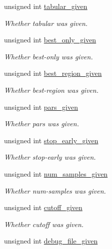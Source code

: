 \begin{DoxyCompactItemize}
unsigned int \hyperlink{structgengetopt__args__info_a3b5a200c98e9f33b1dfa0adf5fbaf69d}{tabular\+\_\+given}
\begin{DoxyCompactList}\small\item\em Whether tabular was given. \end{DoxyCompactList}\item 
unsigned int \hyperlink{structgengetopt__args__info_a6c48b4d066a85f4a580a6a64dbdb176e}{best\+\_\+only\+\_\+given}
\begin{DoxyCompactList}\small\item\em Whether best-\/only was given. \end{DoxyCompactList}\item 
unsigned int \hyperlink{structgengetopt__args__info_afd4b6f3efee5f421948359ec5eea335c}{best\+\_\+region\+\_\+given}
\begin{DoxyCompactList}\small\item\em Whether best-\/region was given. \end{DoxyCompactList}\item 
unsigned int \hyperlink{structgengetopt__args__info_abaf16e517f88e5ad41e06e0584045074}{pars\+\_\+given}
\begin{DoxyCompactList}\small\item\em Whether pars was given. \end{DoxyCompactList}\item 
unsigned int \hyperlink{structgengetopt__args__info_a69729e2dba0de954d98a56a1b3d8d1c1}{stop\+\_\+early\+\_\+given}
\begin{DoxyCompactList}\small\item\em Whether stop-\/early was given. \end{DoxyCompactList}\item 
unsigned int \hyperlink{structgengetopt__args__info_a26d6c50dc3b78c9194509a8399d62888}{num\+\_\+samples\+\_\+given}
\begin{DoxyCompactList}\small\item\em Whether num-\/samples was given. \end{DoxyCompactList}\item 
unsigned int \hyperlink{structgengetopt__args__info_ace7446eaaaffb4c8be5ee2d157933ac1}{cutoff\+\_\+given}
\begin{DoxyCompactList}\small\item\em Whether cutoff was given. \end{DoxyCompactList}\item 
unsigned int \hyperlink{structgengetopt__args__info_a87bd42cd11567d4e27859cc0569752d6}{debug\+\_\+file\+\_\+given}

\end{DoxyCompactItemize}
